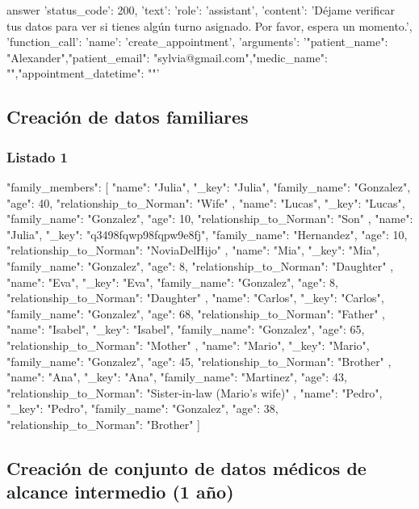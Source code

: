 \begin{APACode}
answer
{'status_code': 200,
 'text': {'role': 'assistant',
          'content': 'Déjame verificar tus datos para ver si tienes algún turno asignado. Por favor, espera un momento.', 
          'function_call': {'name': 'create_appointment',
                           'arguments': '{\n "patient_name": "Alexander",\n "patient_email": "sylvia@gmail.com",\n "medic_name": "",\n "appointment_datetime": ""\n}'}}}
\end{APACode}

\subsection{Creación de datos familiares}

\subsubsection{Listado 1}
\label{anexo:code-4-3-1-1}

\begin{APACode}
{
"family_members": [
{
"name": "Julia",
"_key": "Julia", "family_name": "Gonzalez", "age": 40,
"relationship_to_Norman": "Wife"
},
{
"name": "Lucas",
"_key": "Lucas", "family_name": "Gonzalez", "age": 10, 
"relationship_to_Norman": "Son"
},
{
"name": "Julia",
"_key": "q3498fqwp98fqpw9e8fj", "family_name": "Hernandez", "age": 10,
"relationship_to_Norman": "NoviaDelHijo"
},
{
"name": "Mia",
"_key": "Mia", "family_name": "Gonzalez", "age": 8,
"relationship_to_Norman": "Daughter"
},
{
"name": "Eva",
"_key": "Eva", "family_name": "Gonzalez", "age": 8,
"relationship_to_Norman": "Daughter"
},
{
"name": "Carlos",
"_key": "Carlos", "family_name": "Gonzalez", "age": 68,
"relationship_to_Norman": "Father"
},
{
"name": "Isabel",
"_key": "Isabel", "family_name": "Gonzalez", "age": 65,
"relationship_to_Norman": "Mother"
},
{
"name": "Mario",
"_key": "Mario", "family_name": "Gonzalez", "age": 45,
"relationship_to_Norman": "Brother"
},
{
"name": "Ana",
"_key": "Ana", "family_name": "Martinez", "age": 43,
"relationship_to_Norman": "Sister-in-law (Mario's wife)"
},
{
"name": "Pedro",
"_key": "Pedro", "family_name": "Gonzalez", "age": 38,
"relationship_to_Norman": "Brother"
}
]
}
\end{APACode}

\subsection{Creación de conjunto de datos médicos de alcance intermedio (1 año)}

